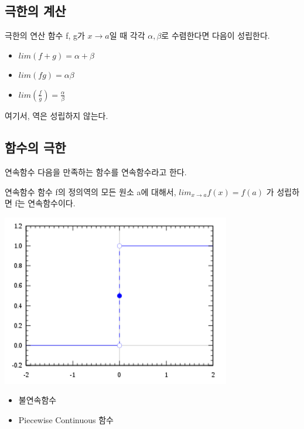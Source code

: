 \documentclass{beamer}
\begin{document}
\subsection{극한의 계산} 

\begin{frame}{극한의 연산}
함수 f, g가 $x \rightarrow a$일 때 각각 $\alpha, \beta$로 수렴한다면 다음이 성립한다. 
\begin{itemize} 
\item $lim(f+g) = \alpha + \beta$
\item $lim(fg) = \alpha \beta$
\item $lim(\frac{f}{g}) = \frac{\alpha}{\beta}$
\end{itemize}
여기서, 역은 성립하지 않는다. 
\end{frame} 



\subsection{함수의 극한}


\begin{frame}{연속함수}
다음을 만족하는 함수를 연속함수라고 한다. 

\begin{block}{연속함수} 
함수 f의 정의역의 모든 원소 a에 대해서, $lim_{x \rightarrow a} f(x) = f(a)$ 가 성립하면 f는 연속함수이다. 
\end{block}


\end{frame} 

\begin{frame}
\includegraphics[width=10cm,keepaspectratio]{step}
\begin{itemize} 
\item 불연속함수 
\item Piecewise Continuous 함수 
\end{itemize}
\end{frame}
\end{document}
